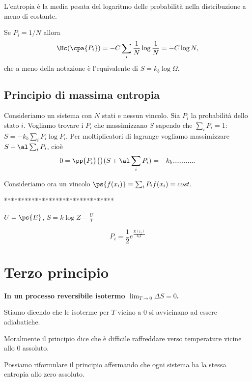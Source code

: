 \begin{remark}
L'entropia \`e la media pesata del logaritmo delle probabilit\`a nella distribuzione a meno di costante.
\end{remark}

\begin{remark}
Se $P_i=1/N$ allora \[\Hc(\cpa{P_i})=-C\sum_i \frac1N\log\frac1N=-C\log N,\]
che a meno della notazione \`e l'equivalente di $S=k_b\log \Omega$.
\end{remark}


\subsection{Principio di massima entropia}
Consideriamo un sistema con $N$ stati e nessun vincolo. Sia $P_i$ la probabilit\`a dello stato $i$. Vogliamo trovare i $P_i$ che massimizzano $S$ sapendo che $\sum_i P_i=1$:\\
$S=-k_b\sum_i P_i\log P_i$. Per moltiplicatori di lagrange vogliamo massimizzare $S+\al \sum_i P_i$, cio\`e
\[0=\pp{P_i}{}(S+\al \sum_i P_i)=-k_b............\]


Consideriamo ora un vincolo $\ps{f(x_i)}=\sum_i P_i f(x_i)=cost.$

********************************


$U=\ps{E}$, $S=k\log Z-\frac UT$

\[P_i=\frac12 e^{\frac{E(x_i)}{k_bT}}\]






\section{Terzo principio}
\begin{fact}
\textbf{In un processo reversibile isotermo $\lim_{T\to 0}\Delta S=0$.}
\end{fact}
\begin{remark}
Stiamo dicendo che le isoterme per $T$ vicino a $0$ si avvicinano ad essere adiabatiche.
\end{remark}

\begin{remark}
Moralmente il principio dice che \`e difficile raffreddare verso temperature vicine allo 0 assoluto.
\end{remark}

\begin{remark}
Possiamo riformulare il principio affermando che ogni sistema ha la stessa entropia allo zero assoluto.
\end{remark}